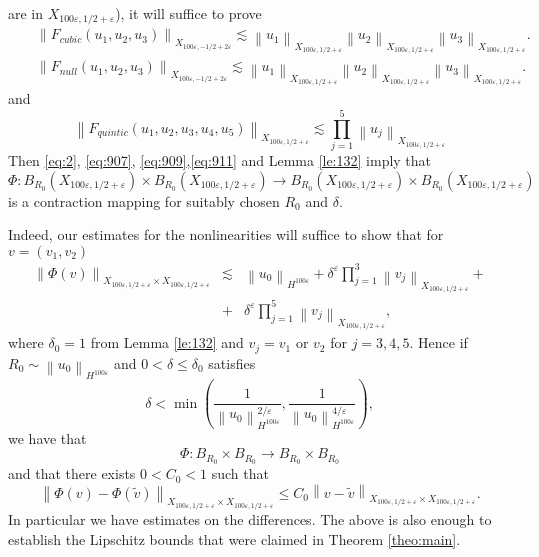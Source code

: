 \documentclass[draft,11pt,leqno]{amsart}
\newcommand{\norm}[2]{{\left\| #1 \right\|}_{#2}}
\newcommand{\de}{\delta}
\newcommand{\ve}{\varepsilon}
\newcommand{\f}{\displaystyle\frac}
\begin{document}
are in $X_{100\ve,1/2+\ve}$), it  will suffice to prove 
\begin{eqnarray}
\label{eq:907}
& &\norm{F_{cubic}(u_1,u_2,u_3)}{X_{100\ve,-1/2+2\ve}}\lesssim 
\norm{u_1}{X_{100\ve,1/2+\ve}}\norm{u_2}{X_{100\ve,1/2+\ve}}
\norm{u_3}{X_{100\ve,1/2+\ve}}.\\
& & \label{eq:909}
\norm{F_{null}(u_1,u_2,u_3)}{X_{100\ve,-1/2+2\ve}}
\lesssim 
\norm{u_1}{X_{100\ve,1/2+\ve}}\norm{u_2}{X_{100\ve,1/2+\ve}}
\norm{u_3}{X_{100\ve,1/2+\ve}}.
\end{eqnarray}
and 
\begin{equation}
\label{eq:911}
\norm{F_{quintic}(u_1,u_2,u_3,u_4,u_5)}{X_{100\ve,1/2+\ve}}\lesssim 
\prod_{j=1}^5\norm{u_j}{X_{100\ve,1/2+\ve}}
\end{equation}
Then  \eqref{eq:2}, \eqref{eq:907}, \eqref{eq:909},\eqref{eq:911}  
and Lemma \ref{le:132} imply that  
$$
\Phi:B_{R_0}(X_{100\ve,1/2+\ve})\times B_{R_0}
(X_{100\ve,1/2+\ve})\to B_{R_0}(X_{100\ve,1/2+\ve})\times 
B_{R_0}(X_{100\ve,1/2+\ve})
$$
is a contraction mapping for suitably chosen $R_0$ and $\de$.

Indeed, our estimates for the nonlinearities 
 will suffice to show that for $v=(v_1,v_2)$
\begin{eqnarray*}
\norm{\Phi(v)}{X_{100\ve,1/2+\ve}\times X_{100\ve,1/2+\ve}}&\lesssim &
\norm{u_0}{H^{100\ve}}+\de^\ve\prod\limits_{j=1}^3\norm{v_j}
{X_{100\ve,1/2+\ve}}+\\
&+& \de^\ve\prod\limits_{j=1}^5\norm{v_j}{X_{100\ve,1/2+\ve}},
\end{eqnarray*}
where $\de_0=1$ from Lemma 
\ref{le:132} and $v_j=v_1$ or $v_2$ for $j=3,4,5$. 
Hence if $R_0\sim \norm{u_0}{H^{100\ve}}$ and $0<\de\leq \de_0$
satisfies 
$$
\de<\min\left(\f{1}{\norm{u_0}{H^{100\ve}}^{2/\ve}},
\f{1}{\norm{u_0}{H^{100\ve}}^{4/\ve}}\right),
$$
we have that 
$$
\Phi:B_{R_0}\times B_{R_0}
\to B_{R_0}\times 
B_{R_0}
$$
and that there exists $0< C_0 <1$ such that 
$$
\norm{\Phi(v)-\Phi(\tilde{v})}
{X_{100\ve,1/2+\ve}\times X_{100\ve,1/2+\ve}}\leq C_0\norm{v-\tilde{v}}
{X_{100\ve,1/2+\ve}\times X_{100\ve,1/2+\ve}}.
$$ In particular we have estimates on the differences. 
The above is also enough to establish the Lipschitz bounds that were claimed in 
Theorem  \ref{theo:main}.
\end{document}
